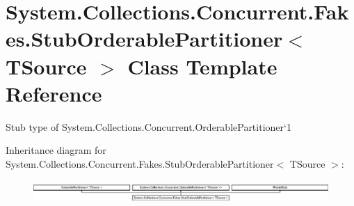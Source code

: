 \hypertarget{class_system_1_1_collections_1_1_concurrent_1_1_fakes_1_1_stub_orderable_partitioner_3_01_t_source_01_4}{\section{System.\-Collections.\-Concurrent.\-Fakes.\-Stub\-Orderable\-Partitioner$<$ T\-Source $>$ Class Template Reference}
\label{class_system_1_1_collections_1_1_concurrent_1_1_fakes_1_1_stub_orderable_partitioner_3_01_t_source_01_4}
}


Stub type of System.\-Collections.\-Concurrent.\-Orderable\-Partitioner`1 


Inheritance diagram for System.\-Collections.\-Concurrent.\-Fakes.\-Stub\-Orderable\-Partitioner$<$ T\-Source $>$\-:\begin{figure}[H]
\begin{center}
\leavevmode
\includegraphics[height=0.831477cm]{class_system_1_1_collections_1_1_concurrent_1_1_fakes_1_1_stub_orderable_partitioner_3_01_t_source_01_4}
\end{center}
\end{figure}

